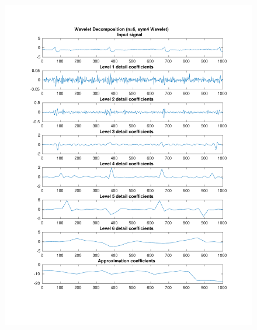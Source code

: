\documentclass{beamer}
\begin{document}
\begin{frame}
\begin{columns}
\begin{figure}
\includegraphics[width=\textwidth]{fig/118l1_dwt2.pdf}
\end{figure}
\end{columns}
\end{frame}
\end{document}
